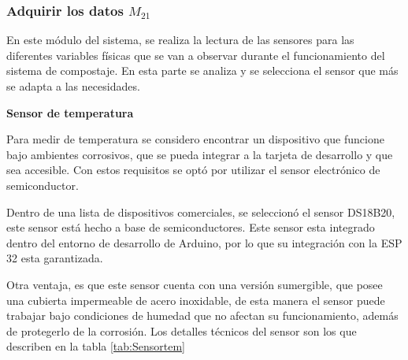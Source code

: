 \subsubsection{Adquirir los datos $M_{21}$}

En este módulo del sistema, se realiza la lectura de las sensores para las diferentes variables físicas que se van a observar durante el funcionamiento del sistema de compostaje. En esta parte se analiza y se selecciona el sensor que más se adapta a las necesidades. 

\textbf{Sensor de temperatura}

Para medir de temperatura se considero encontrar un dispositivo que funcione bajo ambientes corrosivos, que se pueda integrar a la tarjeta de desarrollo y que sea accesible. Con estos requisitos se optó por utilizar el sensor electrónico de semiconductor.


Dentro de una lista de dispositivos comerciales,  se seleccionó el sensor DS18B20, este sensor está hecho a base de semiconductores. Este sensor esta integrado dentro del entorno de desarrollo de Arduino, por lo que su integración con la ESP 32 esta garantizada.

Otra ventaja, es que este sensor cuenta con una versión sumergible, que posee una cubierta  impermeable de acero inoxidable, de esta manera el sensor puede trabajar bajo condiciones de humedad que no afectan su funcionamiento, además de protegerlo de la corrosión.  Los detalles técnicos del sensor son los que describen en la tabla \ref{tab:Sensortem}

